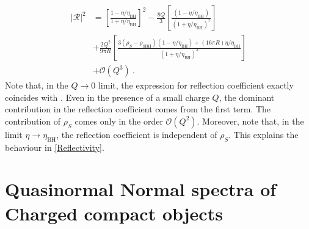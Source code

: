 \documentclass[aps,prd,twocolumn,floatfix,noshowpacs,tightenlines,noshowkeys,superscriptaddress,amsmath,amssymb,
nofootinbib]{revtex4-1}
\renewcommand\[{\begin{equation}}
\renewcommand\]{\end{equation}}
\begin{document}
	\begin{equation}
		\begin{aligned}
|\mathcal{R}|^2&=\left[\frac{1-\eta/\eta_{\textrm{BH}}}{1+\eta/\eta_{\textrm{BH}}}\right]^2-\frac{8Q}{3}\left[\frac{(1-\eta/\eta_{\textrm{BH}})}{(1+\eta/\eta_{\textrm{BH}})^2}\right]\\
&+\frac{2Q^2}{9\pi R}\left[\frac{3(\rho_{S}-\rho_{\textrm{SBH}})(1-\eta/\eta_{\textrm{BH}})+(16\pi R)\eta/\eta_{\textrm{BH}}}{(1+\eta/\eta_{\textrm{BH}})^3}\right]\\&+\mathcal{O}(Q^3)~.
		\end{aligned}
	\end{equation}
Note that, in the $Q\to 0$ limit, the expression for reflection coefficient exactly coincides with \cite{Maggio:2020jml}. Even in the presence of a small charge $Q$, the dominant contribution in the reflection coefficient comes from the first term. 
The contribution of $\rho_{S}$ comes only in the order $\mathcal{O}(Q^2)$. Moreover, note that, in the limit $\eta\to \eta_{\textrm{BH}}$, the reflection coefficient is independent of $\rho_{S}$. This explains the behaviour in \autoref{Reflectivity}.

\section{Quasinormal Normal spectra of Charged compact objects}\label{Sec_QNM}
\end{document}
